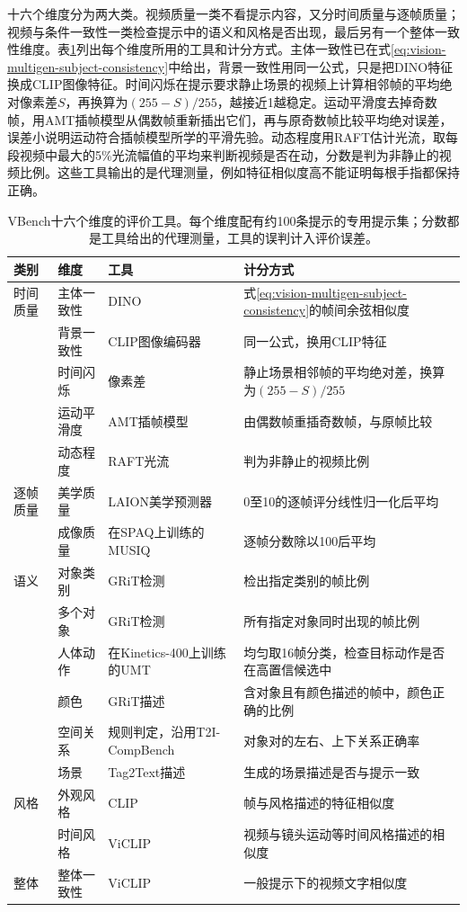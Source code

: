 十六个维度分为两大类。视频质量一类不看提示内容，又分时间质量与逐帧质量；视频与条件一致性一类检查提示中的语义和风格是否出现，最后另有一个整体一致性维度。表\ref{tab:vision-multigen-vbench-dims}列出每个维度所用的工具和计分方式。主体一致性已在式\eqref{eq:vision-multigen-subject-consistency}中给出，背景一致性用同一公式，只是把DINO特征换成CLIP图像特征。时间闪烁在提示要求静止场景的视频上计算相邻帧的平均绝对像素差$S$，再换算为$(255-S)/255$，越接近1越稳定。运动平滑度去掉奇数帧，用AMT插帧模型从偶数帧重新插出它们，再与原奇数帧比较平均绝对误差，误差小说明运动符合插帧模型所学的平滑先验。动态程度用RAFT估计光流，取每段视频中最大的5\%光流幅值的平均来判断视频是否在动，分数是判为非静止的视频比例。这些工具输出的是代理测量，例如特征相似度高不能证明每根手指都保持正确。

\begin{table}[tbp]
 \centering
 \small
 \begin{tabularx}{\linewidth}{@{}p{22mm}p{26mm}p{34mm}X@{}}
  \toprule
  类别 & 维度 & 工具 & 计分方式 \\
  \midrule
  时间质量 & 主体一致性 & DINO & 式\eqref{eq:vision-multigen-subject-consistency}的帧间余弦相似度 \\
   & 背景一致性 & CLIP图像编码器 & 同一公式，换用CLIP特征 \\
   & 时间闪烁 & 像素差 & 静止场景相邻帧的平均绝对差，换算为$(255-S)/255$ \\
   & 运动平滑度 & AMT插帧模型 & 由偶数帧重插奇数帧，与原帧比较 \\
   & 动态程度 & RAFT光流 & 判为非静止的视频比例 \\
  逐帧质量 & 美学质量 & LAION美学预测器 & 0至10的逐帧评分线性归一化后平均 \\
   & 成像质量 & 在SPAQ上训练的MUSIQ & 逐帧分数除以100后平均 \\
  语义 & 对象类别 & GRiT检测 & 检出指定类别的帧比例 \\
   & 多个对象 & GRiT检测 & 所有指定对象同时出现的帧比例 \\
   & 人体动作 & 在Kinetics-400上训练的UMT & 均匀取16帧分类，检查目标动作是否在高置信候选中 \\
   & 颜色 & GRiT描述 & 含对象且有颜色描述的帧中，颜色正确的比例 \\
   & 空间关系 & 规则判定，沿用T2I-CompBench & 对象对的左右、上下关系正确率 \\
   & 场景 & Tag2Text描述 & 生成的场景描述是否与提示一致 \\
  风格 & 外观风格 & CLIP & 帧与风格描述的特征相似度 \\
   & 时间风格 & ViCLIP & 视频与镜头运动等时间风格描述的相似度 \\
  整体 & 整体一致性 & ViCLIP & 一般提示下的视频文字相似度 \\
  \bottomrule
 \end{tabularx}
 \caption{VBench十六个维度的评价工具。每个维度配有约100条提示的专用提示集；分数都是工具给出的代理测量，工具的误判计入评价误差。}
 \label{tab:vision-multigen-vbench-dims}
\end{table}
\FloatBarrier

